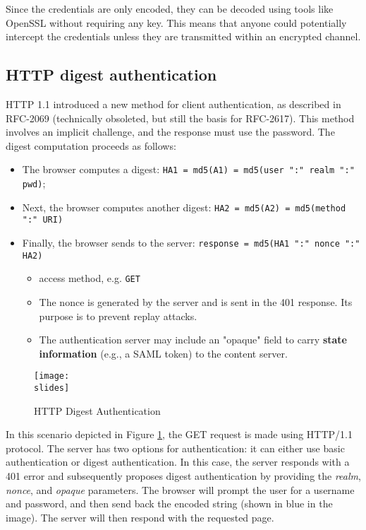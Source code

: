 Since the credentials are only encoded, they can be decoded using tools like OpenSSL without requiring any key. This means that anyone could potentially intercept the credentials unless they are transmitted within an encrypted channel.

\subsection{HTTP digest authentication}
HTTP 1.1 introduced a new method for client authentication, as described in RFC-2069 (technically obsoleted, but still the basis for RFC-2617). This method involves an implicit challenge, and the response must use the password. The digest computation proceeds as follows:

\begin{itemize}
    \item The browser computes a digest:
          \texttt{HA1 = md5(A1) = md5(user ":" realm ":" pwd)};
    \item Next, the browser computes another digest: \texttt{HA2 = md5(A2) = md5(method ":" URI)}
    \item Finally, the browser sends to the server: \texttt{response = md5(HA1 ":" nonce ":" HA2)}
          \begin{itemize}
              \item access method, e.g. \texttt{GET}
          \end{itemize}
          \begin{itemize}
              \item The nonce is generated by the server and is sent in the 401 response. Its purpose is to prevent replay attacks.
              \item The authentication server may include an "opaque" field to carry \textbf{state information} (e.g., a SAML token) to the content server.
          \end{itemize}
\end{itemize}


\begin{figure}[h]
    \centering
    \texttt{[image: \\slides]}
    \caption{HTTP Digest Authentication}
    \label{fig:http-digest-authentication}
\end{figure}

In this scenario depicted in Figure \ref*{fig:http-digest-authentication}, the GET request is made using HTTP/1.1 protocol. The server has two options for authentication: it can either use basic authentication or digest authentication. In this case, the server responds with a 401 error and subsequently proposes digest authentication by providing the \textit{realm}, \textit{nonce}, and \textit{opaque} parameters. The browser will prompt the user for a username and password, and then send back the encoded string (shown in blue in the image). The server will then respond with the requested page.


